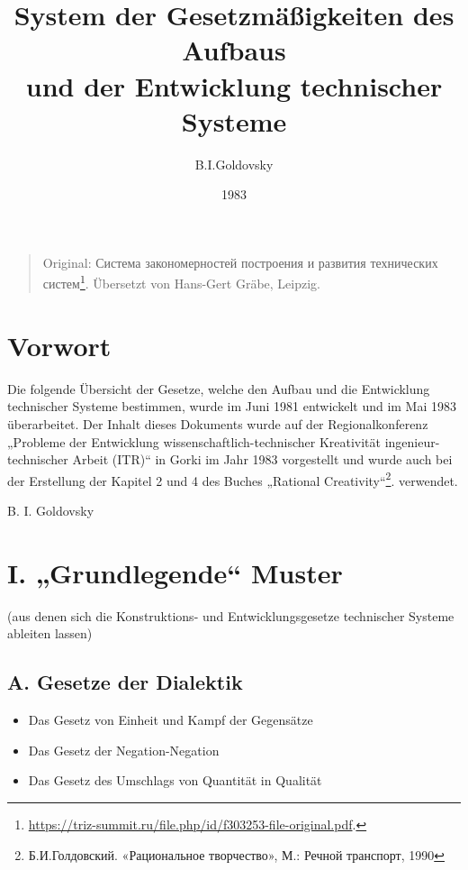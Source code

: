 \documentclass[11pt,a4paper]{article}
\title{System der Gesetzmäßigkeiten des Aufbaus\\ und der Entwicklung
  technischer Systeme }
\author{B.I.Goldovsky}
\date{1983}
\begin{document}
\maketitle
\begin{quote}
  Original: \foreignlanguage{russian}{Система закономерностей построения и
    развития технических
    систем}\footnote{\url{https://triz-summit.ru/file.php/id/f303253-file-original.pdf}.}.
  Übersetzt von Hans-Gert Gräbe, Leipzig.
\end{quote}

\section*{Vorwort}

Die folgende Übersicht der Gesetze, welche den Aufbau und die Entwicklung
technischer Systeme bestimmen, wurde im Juni 1981 entwickelt und im Mai 1983
überarbeitet. Der Inhalt dieses Dokuments wurde auf der Regionalkonferenz
„Probleme der Entwicklung wissenschaftlich-technischer Kreativität
ingenieur-technischer Arbeit (ITR)“ in Gorki im Jahr 1983 vorgestellt und
wurde auch bei der Erstellung der Kapitel 2 und 4 des Buches „Rational
Creativity“\footnote{\foreignlanguage{russian}{Б.И.Голдовский. «Рациональное
    творчество», М.: Речной транспорт, 1990}}. verwendet.

\begin{flushright}
  B. I. Goldovsky
\end{flushright}

\section*{I. „Grundlegende“ Muster}
(aus denen sich die Konstruktions- und Entwicklungsgesetze technischer Systeme
ableiten lassen) 
\subsection*{A. Gesetze der Dialektik}
\begin{itemize}\itemsep0pt
\item[1.1.] Das Gesetz von Einheit und Kampf der Gegensätze
\item[1.2.] Das Gesetz der Negation-Negation
\item[1.3.] Das Gesetz des Umschlags von Quantität in Qualität
\end{itemize}
\end{document}

